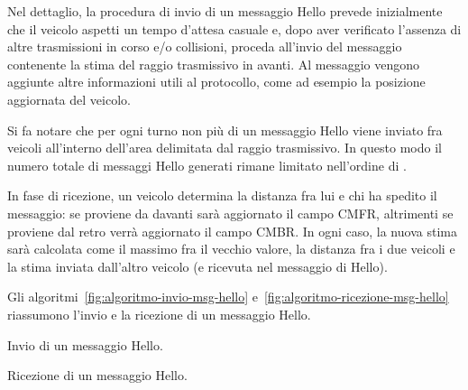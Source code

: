 Nel dettaglio, la procedura di invio di un messaggio Hello prevede inizialmente che il veicolo aspetti un tempo d'attesa casuale e,
dopo aver verificato l'assenza di altre trasmissioni in corso e/o collisioni, proceda all'invio del messaggio contenente
la stima del raggio trasmissivo in avanti.
Al messaggio vengono aggiunte altre informazioni utili al protocollo, come ad esempio la posizione aggiornata del veicolo.

Si fa notare che per ogni turno non più di un messaggio Hello viene inviato fra veicoli all'interno dell'area delimitata dal raggio trasmissivo.
In questo modo il numero totale di messaggi Hello generati rimane limitato nell'ordine di .

In fase di ricezione, un veicolo determina la distanza fra lui e chi ha spedito il messaggio: se proviene da davanti sarà aggiornato il campo CMFR,
altrimenti se proviene dal retro verrà aggiornato il campo CMBR.
In ogni caso, la nuova stima sarà calcolata come il massimo fra il vecchio valore, la distanza fra i due veicoli e la stima inviata dall'altro veicolo
(e ricevuta nel messaggio di Hello).

Gli algoritmi~\ref{fig:algoritmo-invio-msg-hello} e~\ref{fig:algoritmo-ricezione-msg-hello} riassumono l'invio e la ricezione di un messaggio Hello.
%
\begin{italianalgorithm}[h]
\caption{Invio di un messaggio Hello.}\label{fig:algoritmo-invio-msg-hello}
\begin{algorithmic}[1]
		\EndIf{}
	\EndFor{}
\end{algorithmic}
\end{italianalgorithm}
%
\begin{italianalgorithm}[h]
\caption{Ricezione di un messaggio Hello.}\label{fig:algoritmo-ricezione-msg-hello}
\begin{algorithmic}[1]
\end{algorithmic}
\end{italianalgorithm}
%
